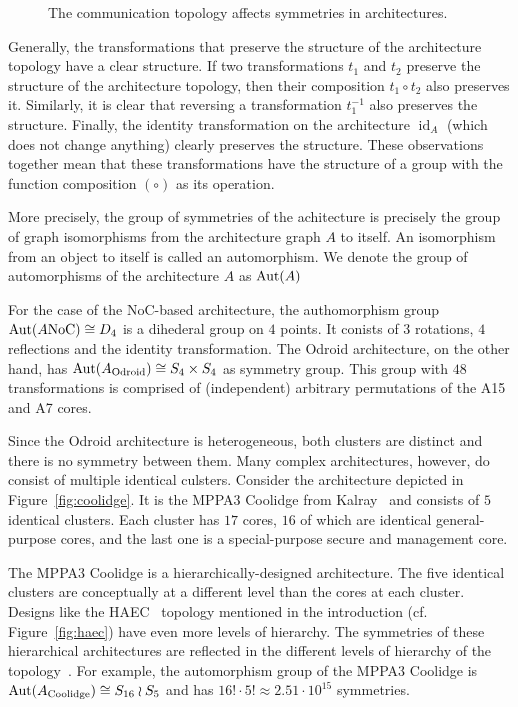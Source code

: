 \begin{figure}[h]
	\centering
\resizebox{0.3\textwidth}{!}{
   \begin{tikzpicture}
     
   \end{tikzpicture}
 }
   \caption{The communication topology affects symmetries in architectures.}
   \label{fig:non_equivalent}
\end{figure}

Generally, the transformations that preserve the structure of the architecture topology have a clear structure.
If two transformations $t_1$ and $t_2$ preserve the structure of the architecture topology, then their composition $t_1 \circ t_2$ also preserves it.
Similarly, it is clear that reversing a transformation $t_1^{-1}$ also preserves the structure.
Finally, the identity transformation on the architecture $\operatorname{id}_A$ (which does not change anything) clearly preserves the structure.
These observations together mean that these transformations have the structure of a group with the function composition $(\circ)$ as its operation.

More precisely, the group of symmetries of the achitecture is precisely the group of graph isomorphisms from the architecture graph $A$ to itself.
An isomorphism from an object to itself is called an automorphism.
We denote the group of automorphisms of the architecture $A$ as $\operatorname{Aut}(A)$

For the case of the \ac{NoC}-based architecture, the authomorphism group $\operatorname{Aut}(A\text{NoC}) \cong D_4$ is a dihederal group on $4$ points.
It conists of $3$ rotations, $4$ reflections and the identity transformation.
The Odroid architecture, on the other hand, has $\operatorname{Aut}(A_\text{Odroid}) \cong S_4 \times S_4$ as symmetry group.
This group with $48$ transformations is comprised of (independent) arbitrary permutations of the A15 and A7 cores.

Since the Odroid architecture is heterogeneous, both clusters are distinct and there is no symmetry between them.
Many complex architectures, however, do consist of multiple identical culsters. Consider the architecture depicted in Figure~\ref{fig:coolidge}.
It is the MPPA3 Coolidge from Kalray~\cite{coolidge} and consists of $5$ identical clusters.
Each cluster has $17$ cores, $16$ of which are identical general-purpose cores, and the last one is a special-purpose secure and management core.

The MPPA3 Coolidge is a hierarchically-designed architecture. The five identical clusters are conceptually at a different level than the cores at each cluster.
Designs like the HAEC~\cite{HAEC} topology mentioned in the introduction (cf. Figure~\ref{fig:haec}) have even more levels of hierarchy.
The symmetries of these hierarchical architectures are reflected in the different levels of hierarchy of the topology~\cite{goens_tcad21}.
For example, the automorphism group of the MPPA3 Coolidge is $\operatorname{Aut}(A_\text{Coolidge}) \cong S_{16} \wr S_5$ and has $16! \cdot 5! \approx 2.51 \cdot 10^{15}$ symmetries. 

